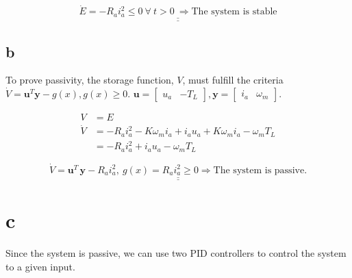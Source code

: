 \documentclass{article}
\begin{document}
\begin{equation*}
	\underline{\underline{\dot E = -R_ai_a^2 \leq 0 \:\forall\: t > 0 \: \Rightarrow \text{The system is stable}}}
\end{equation*}

\subsection{b}
To prove passivity, the storage function, $V$, must fulfill the criteria $\dot V = \mathbf{u}^T\mathbf{y} - g(x), g(x) \geq 0$. $\mathbf{u} = \begin{bmatrix} u_a & -T_L\end{bmatrix}, \mathbf{y} = \begin{bmatrix} i_a & \omega_m\end{bmatrix}$.

\begin{align*}
	V &= E\\
	\dot V &= -R_ai_a^2 - K\omega_mi_a + i_au_a+K\omega_mi_a - \omega_mT_L\\
	&= -R_ai_a^2 + i_au_a - \omega_mT_L
\end{align*}

\begin{equation*}
	\underline{\underline{\dot V =\mathbf{u}^T\,\mathbf{y} - R_ai_a^2, \: g(x) = R_ai_a^2 \geq 0 \Rightarrow \text{The system is passive.}}}
\end{equation*}

\section{c}

Since the system is passive, we can use two PID controllers to control the system to a given input. 
\end{document}

